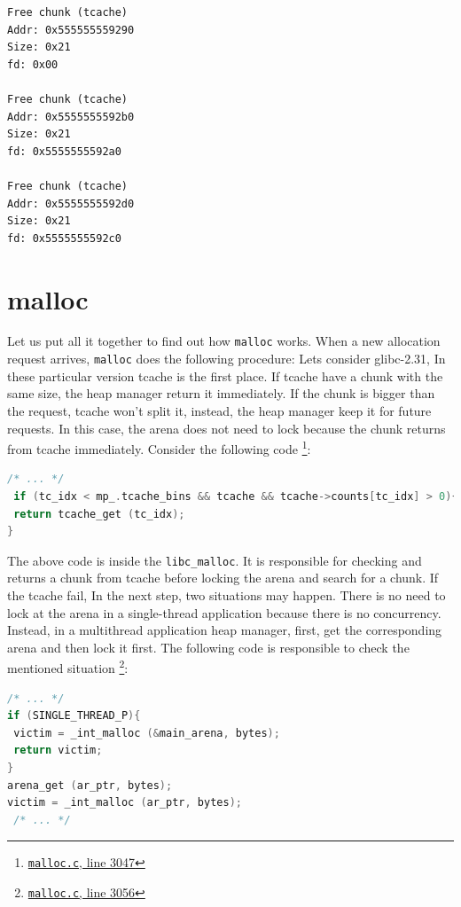 \documentclass{masterthesis}
\newcommand*\libc{glibc}
\newcommand*\tch{tcache}
\newcommand*\mallocc{\lstinline{malloc}}
\begin{document}
\begin{lstlisting}[frame=tlrb]
Free chunk (tcache)
Addr: 0x555555559290
Size: 0x21
fd: 0x00

Free chunk (tcache)
Addr: 0x5555555592b0
Size: 0x21
fd: 0x5555555592a0

Free chunk (tcache)
Addr: 0x5555555592d0
Size: 0x21
fd: 0x5555555592c0
\end{lstlisting}

\section{malloc}
Let us put all it together to find out how \mallocc{} works. When a new allocation request arrives, \mallocc{} does the following procedure:
Lets consider \libc{-2.31}, In these particular version \tch{} is the first place. If \tch{} have a chunk with the same size, the heap manager return it immediately. If the chunk is bigger than the request, \tch{} won't split it, instead, the heap manager keep it for future requests. In this case, the arena does not need to lock because the chunk returns from \tch{} immediately. Consider the following code \footnote{\href{https://sourceware.org/git/?p=glibc.git;a=blob;f=malloc/malloc.c;h=f7cd29bc2f93e1082ee77800bd64a4b2a2897055;hb=9ea3686266dca3f004ba874745a4087a89682617\#l3047}{\texttt{malloc.c}, line 3047}}:

\begin{lstlisting}[language=c,frame=tlrb]
 /* ... */
 if (tc_idx < mp_.tcache_bins && tcache && tcache->counts[tc_idx] > 0){
 return tcache_get (tc_idx);
}
\end{lstlisting}

The above code is inside the \lstinline{libc_malloc}. It is responsible for checking and returns a chunk from \tch{} before locking the arena and search for a chunk. If the \tch{} fail, In the next step, two situations may happen. There is no need to lock at the arena in a single-thread application because there is no concurrency. Instead, in a multi\-thread application heap manager, first, get the corresponding arena and then lock it first. The following code is responsible to check the mentioned situation \footnote{\href{https://sourceware.org/git/?p=glibc.git;a=blob;f=malloc/malloc.c;h=f7cd29bc2f93e1082ee77800bd64a4b2a2897055;hb=9ea3686266dca3f004ba874745a4087a89682617\#l3056}{\texttt{malloc.c}, line 3056}}:

\begin{lstlisting}[language=c,frame=tlrb]
 /* ... */
if (SINGLE_THREAD_P){
 victim = _int_malloc (&main_arena, bytes);
 return victim;
}
arena_get (ar_ptr, bytes);
victim = _int_malloc (ar_ptr, bytes);
 /* ... */
\end{lstlisting}
\end{document}
